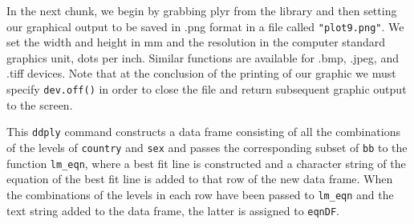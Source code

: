 \documentclass[titlepage]{book}\usepackage{knitr}
\begin{document}
In the next chunk, we begin by grabbing plyr from the library and then setting our graphical output to be saved in .png format in a file called \texttt{"plot9.png"}. We set the width and height in mm and the resolution in the computer  standard graphics unit, dots per inch. Similar functions are available for .bmp, .jpeg, and .tiff devices. Note that at the conclusion of the printing of our graphic we must specify \texttt{dev.off()} in order to close the file and return subsequent graphic output to the screen.
\begin{knitrout}
\color{fgcolor}\begin{kframe}
\begin{alltt}
\hlstd{(}\hlstd{,}  \hlstd{=} \hlstd{,}  \hlstd{=} \hlstd{,}  \hlstd{=} \hlstd{)}
 \hlkwb{<-} 
 \hlkwb{<-}  \hlopt{+} \hlstd{(}         \hlstd{=} \hlstd{)}
 \hlkwb{<-}  \hlopt{+} \hlstd{()}
 \hlkwb{<-}  \hlopt{+} \hlstd{(}  \hlstd{=} \hlstd{)} 
 \hlkwb{<-}  \hlopt{+}  \hlopt{~} 
 \hlkwb{<-}  \hlopt{+} \hlstd{(} \hlstd{=} \hlstd{)}
 \hlkwb{<-}  \hlopt{+} \hlstd{(}\hlstd{)}
 \hlkwb{<-}  \hlopt{+} \hlstd{(}\hlstd{)}
 \hlkwb{<-} \hlstd{(}                                
 \hlkwb{<-}  \hlopt{+} \hlstd{(} \hlstd{(} \hlstd{=} \hlstd{,} \hlstd{=} \hlstd{,} 
                        \hlstd{=} \hlstd{,} \hlstd{=} \hlstd{)}
\hlstd{()}
\end{alltt}
\end{kframe}
\end{knitrout}
This \texttt{ddply} command constructs a data frame consisting of all the combinations of the levels of \texttt{country} and \texttt{sex} and passes the corresponding subset of \texttt{bb} to the function \texttt{lm\_eqn}, where a best fit line is constructed and a character string of the equation of the best fit line is added to that row of the new data frame. When the combinations of the levels in each row have been passed to \texttt{lm\_eqn} and the text string added to the data frame, the latter is assigned to \texttt{eqnDF}.
\end{document}

